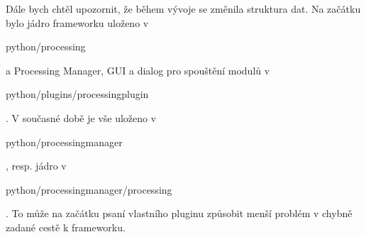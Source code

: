 Dále bych chtěl upozornit, že během vývoje se změnila struktura dat. Na začátku bylo jádro frameworku uloženo v \begin{scriptsize}python/processing\end{scriptsize} a Processing Manager, GUI a dialog pro spouštění modulů v \begin{scriptsize}python/plugins/processingplugin\end{scriptsize}. V současné době je vše uloženo v \begin{scriptsize}python/processingmanager\end{scriptsize}, resp. jádro v \begin{scriptsize}python/processingmanager/processing\end{scriptsize}. To může na začátku psaní vlastního pluginu způsobit menší problém v chybně zadané cestě k frameworku.

\newpage
